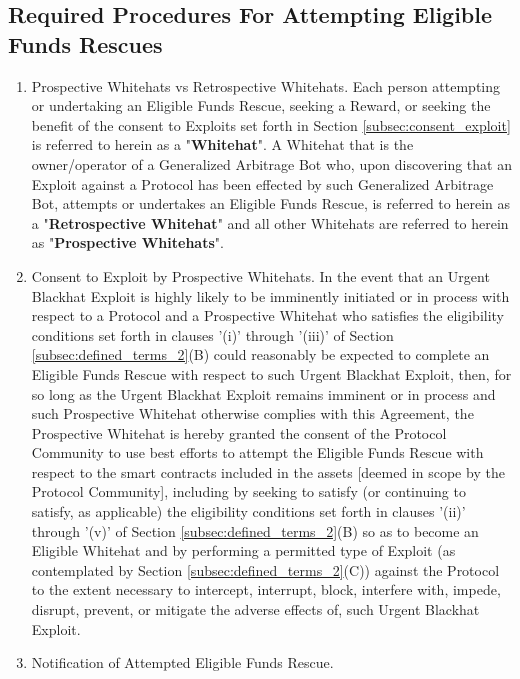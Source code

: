\documentclass{article}
\begin{document}
\subsection{Required Procedures For Attempting Eligible Funds Rescues}\label{sec:req_procedure_rescue}

\begin{enumerate}[label=\Alph*.]
    \item Prospective Whitehats vs Retrospective Whitehats. Each person attempting or undertaking an Eligible Funds Rescue, seeking a Reward, or seeking the benefit of the consent to Exploits set forth in Section \ref{subsec:consent_exploit} is referred to herein as a "\textbf{Whitehat}". A Whitehat that is the owner/operator of a Generalized Arbitrage Bot who, upon discovering that an Exploit against a Protocol has been effected by such Generalized Arbitrage Bot, attempts or undertakes an Eligible Funds Rescue, is referred to herein as a "\textbf{Retrospective Whitehat}" and all other Whitehats are referred to herein as "\textbf{Prospective Whitehats}".

    \item Consent to Exploit by Prospective Whitehats.\label{subsec:consent_exploit} In the event that an Urgent Blackhat Exploit is highly likely to be imminently initiated or in process with respect to a Protocol and a Prospective Whitehat who satisfies the eligibility conditions set forth in clauses '(i)' through '(iii)' of Section \ref{subsec:defined_terms_2}(B) could reasonably be expected to complete an Eligible Funds Rescue with respect to such Urgent Blackhat Exploit, then, for so long as the Urgent Blackhat Exploit remains imminent or in process and such Prospective Whitehat otherwise complies with this Agreement, the Prospective Whitehat is hereby granted the consent of the Protocol Community to use best efforts to attempt the Eligible Funds Rescue with respect to the smart contracts included in the assets [deemed in scope by the Protocol Community], including by seeking to satisfy (or continuing to satisfy, as applicable) the eligibility conditions set forth in clauses '(ii)' through '(v)' of Section \ref{subsec:defined_terms_2}(B) so as to become an Eligible Whitehat and by performing a permitted type of Exploit (as contemplated by Section \ref{subsec:defined_terms_2}(C)) against the Protocol to the extent necessary to intercept, interrupt, block, interfere with, impede, disrupt, prevent, or mitigate the adverse effects of, such Urgent Blackhat Exploit.

    \item Notification of Attempted Eligible Funds Rescue.\label{subsec:notification_attempted_rescue}


\end{enumerate}
\end{document}
